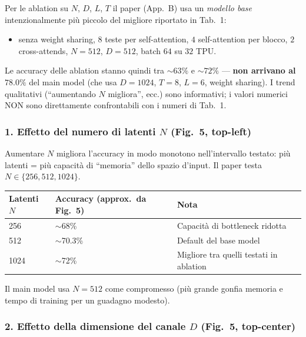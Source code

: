 \documentclass[
  11pt,
]{article}
\begin{document}
\begin{notabox}[title={\textbf{Attenzione: ablation su un modello ridotto, non sul best model}}]
Per le ablation su $N$, $D$, $L$, $T$ il paper (App.\ B) usa un \emph{modello base} intenzionalmente più piccolo del migliore riportato in Tab.\ 1:
\begin{itemize}
\item senza weight sharing, $8$ teste per self-attention, $4$ self-attention per blocco, $2$ cross-attends, $N = 512$, $D = 512$, batch $64$ su $32$ TPU.
\end{itemize}
Le accuracy delle ablation stanno quindi tra $\sim63\%$ e $\sim72\%$ --- \textbf{non arrivano al $78.0\%$} del main model (che usa $D = 1024$, $T = 8$, $L = 6$, weight sharing). I trend qualitativi (``aumentando $N$ migliora'', ecc.) sono informativi; i valori numerici NON sono direttamente confrontabili con i numeri di Tab.\ 1.
\end{notabox}

\subsubsection*{1. Effetto del numero di latenti $N$ (Fig.\ 5, top-left)}

Aumentare $N$ migliora l'accuracy in modo monotono nell'intervallo testato: più latenti = più capacità di ``memoria'' dello spazio d'input. Il paper testa $N \in \{256, 512, 1024\}$.

{\small
\begin{longtable}{@{}p{3cm} p{3cm} p{6cm}@{}}
\toprule
\textbf{Latenti $N$} & \textbf{Accuracy (approx.\ da Fig.\ 5)} & \textbf{Nota} \\
\midrule
\endhead
256  & $\sim$68\% & Capacità di bottleneck ridotta \\[2pt]
512  & $\sim$70.3\% & Default del base model \\[2pt]
1024 & $\sim$72\%   & Migliore tra quelli testati in ablation \\[2pt]
\bottomrule
\end{longtable}
}

Il main model usa $N = 512$ come compromesso (più grande gonfia memoria e tempo di training per un guadagno modesto).

\subsubsection*{2. Effetto della dimensione del canale $D$ (Fig.\ 5, top-center)}
\end{document}
